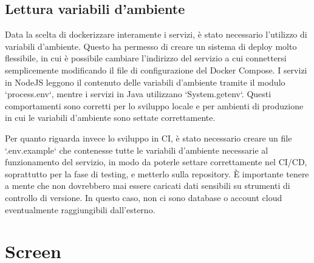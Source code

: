 \subsection{Lettura variabili d'ambiente}

Data la scelta di dockerizzare interamente i servizi, è stato necessario l'utilizzo di variabili d'ambiente. Questo ha permesso di creare un sistema di deploy molto flessibile, in cui è possibile cambiare l'indirizzo del servizio a cui connettersi semplicemente modificando il file di configurazione del Docker Compose. I servizi in NodeJS leggono il contenuto delle variabili d'ambiente tramite il modulo `process.env`, mentre i servizi in Java utilizzano `System.getenv`. Questi comportamenti sono corretti per lo sviluppo locale e per ambienti di produzione in cui le variabili d'ambiente sono settate correttamente.

Per quanto riguarda invece lo sviluppo in CI, è stato necessario creare un file `.env.example` che contenesse tutte le variabili d'ambiente necessarie al funzionamento del servizio, in modo da poterle settare correttamente nel CI/CD, soprattutto per la fase di testing, e metterlo sulla repository. È importante tenere a mente che non dovrebbero mai essere caricati dati sensibili su strumenti di controllo di versione. In questo caso, non ci sono database o account cloud eventualmente raggiungibili dall'esterno.

\section{Screen}
